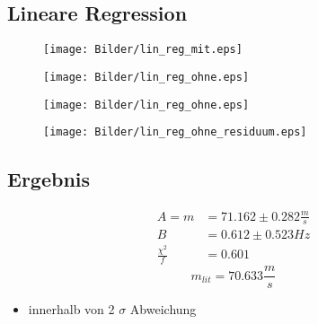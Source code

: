 \documentclass[11pt]{beamer}
\begin{document}
\subsection{Lineare Regression}
\begin{frame}
\begin{figure}[H]\centering
\texttt{[image: Bilder/lin\_reg\_mit.eps]}
\end{figure}
\begin{figure}[H]
\centering
\texttt{[image: Bilder/lin\_reg\_ohne.eps]}
\end{figure}
\end{frame}

\begin{frame}
\begin{figure}[H]
\centering
\texttt{[image: Bilder/lin\_reg\_ohne.eps]}
\end{figure}
\begin{figure}[H]
\centering
\texttt{[image: Bilder/lin\_reg\_ohne\_residuum.eps]}
\end{figure}
\end{frame}
\subsection{Ergebnis}
\begin{frame}
\begin{align*}
A = m &= 71.162 \pm 0.282 \frac{m}{s}  \\
B &= 0.612 \pm 0.523 Hz \\
\frac{\chi^2}{f}&=0.601
\end{align*}
\begin{equation*}
m_{lit}=70.633 \frac{m}{s}
\end{equation*}
\begin{itemize}
\item innerhalb von 2 $\sigma$ Abweichung
\end{itemize}
\end{frame}
\end{document}

